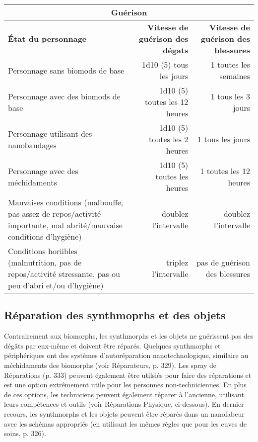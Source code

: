 \begin{table} \begin{tabularx}{\textwidth}{|X|r|r|} \hline

\multicolumn{3}{|c|}{\textbf{Guérison}} \\ \hline

\textbf{État du personnage}	&\textbf{Vitesse de guérison des dégats}	&\textbf{Vitesse de guérison des blessures} \\ \hline

Personnage sans biomods de base	&1d10 (5) tous les  jours &1 toutes les semaines	\\ \hline

Personnage avec des biomods de base	&1d10 (5) toutes les 12 heures	&1 tous les 3 jours	\\ \hline

Personnage utilisant des nanobandages	&1d10 (5) toutes les 2 heures	&1 tous les jours	\\ \hline

Personnage avec des méchidaments	&1d10 (5) toutes les heures	&1 toutes les 12 heures	\\ \hline

Mauvaises conditions (malbouffe, pas assez de repos/activité importante, mal abrité/mauvaise conditions d'hygiène) &doublez l'intervalle &doublez l'intervalle \\ \hline

Conditions horiibles (malnutrition, pas de repos/activité stressante, pas ou peu d'abri et/ou d'hygiène) &triplez l'intervalle &pas de guérison des blessures\\ \hline

\end{tabularx} \label{tab:healing} \end{table} 

\subsection{Réparation des synthmoprhs et des objets} 

Contrairement aux biomorphs, les synthmorphs et les objets ne guérissent pas des dégâts par eux-même et doivent être réparés. Quelques synthmorphs et périphériques ont des systèmes d'autoréparation nanotechnologique, similaire au méchidaments des biomorphs (voir Réparateurs, p. 329). Les spray de Réparations (p. 333) peuvent également être utilsiés pour faire des réparations et est une option extrêmement utile pour les personnes non-techniciennes. En plus de ces options, les techniciens peuvent également réparer à l'ancienne, utilisant leurs compétences et outils (voir Réparations Physique, ci-dessous). En dernier recours, les synthmorphs et les objets peuvent être réparés dans un nanofabeur avec les schémas appropriés (en utilisant les mêmes règles que pour les cuves de soins, p. 326). 

